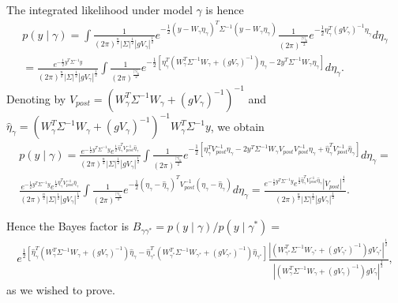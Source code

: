 The integrated likelihood under model $\gamma$ is hence
\begin{align}
 p(y \mid \gamma)= \int \frac{1}{(2\pi)^{\frac{n}{2}} |\Sigma|^{\frac{1}{2}} |g V_\gamma|^{\frac{1}{2}}} 
e^{  -\frac{1}{2} (y - W_\gamma \eta_\gamma)^T \Sigma^{-1} (y - W_\gamma \eta_\gamma)}
\frac{1}{(2\pi)^{\frac{|\gamma|_0}{2}}} 
e^{ -\frac{1}{2} \eta_\gamma^T (gV_\gamma)^{-1} \eta_\gamma}
d \eta_\gamma
\nonumber \\
=\frac{e^{-\frac{1}{2}y^T \Sigma^{-1} y}}{(2\pi)^{\frac{n}{2}} |\Sigma|^{\frac{1}{2}} |g V_\gamma|^{\frac{1}{2}}} 
\int \frac{1}{(2\pi)^{\frac{|\gamma|_0}{2}} } 
e^{-\frac{1}{2} \left[ \eta_\gamma^T (W_\gamma^T \Sigma^{-1} W_\gamma + (g V_\gamma)^{-1}) \eta_\gamma - 2 y^T \Sigma^{-1} W_\gamma \eta_\gamma  \right]}
d \eta_\gamma.
\nonumber
\end{align}
Denoting by $V_{post}= (W_\gamma^T \Sigma^{-1} W_\gamma + (g V_\gamma)^{-1})^{-1}$ and
$\hat{\eta}_\gamma= (W_\gamma^T \Sigma^{-1} W_\gamma + (g V_\gamma)^{-1})^{-1} W_\gamma^T \Sigma^{-1} y$, we obtain
\begin{align}
  p(y \mid \gamma)= 
\frac{e^{-\frac{1}{2}y^T \Sigma^{-1} y} e^{\frac{1}{2}\hat{\eta}_\gamma^T V_{post}^{-1} \hat{\eta}_\gamma}}{(2\pi)^{\frac{n}{2}} |\Sigma|^{\frac{1}{2}} |g V_\gamma|^{\frac{1}{2}}} 
\int \frac{1}{(2\pi)^{\frac{|\gamma|_0}{2}} } 
e^{-\frac{1}{2} \left[ \eta_\gamma^T V_{post}^{-1} \eta_\gamma - 2 y^T \Sigma^{-1} W_\gamma V_{post} V_{post}^{-1} \eta_\gamma + \hat{\eta}_\gamma^T V_{post}^{-1} \hat{\eta}_\gamma  \right]}
d \eta_\gamma=
\nonumber \\
\frac{e^{-\frac{1}{2}y^T \Sigma^{-1} y} e^{\frac{1}{2}\hat{\eta}_\gamma^T V_{post}^{-1} \hat{\eta}_\gamma}}{(2\pi)^{\frac{n}{2}} |\Sigma|^{\frac{1}{2}}  |g V_\gamma|^{\frac{1}{2}}} 
\int \frac{1}{(2\pi)^{\frac{|\gamma|_0}{2}}} 
e^{-\frac{1}{2} (\eta_\gamma - \hat{\eta}_\gamma)^T V_{post}^{-1} (\eta_\gamma - \hat{\eta}_\gamma)}
d \eta_\gamma=
\frac{e^{-\frac{1}{2}y^T \Sigma^{-1} y} e^{\frac{1}{2}\hat{\eta}_\gamma^T V_{post}^{-1} \hat{\eta}_\gamma} |V_{post}|^{\frac{1}{2}}}{(2\pi)^{\frac{n}{2}} |\Sigma|^{\frac{1}{2}}  |g V_\gamma|^{\frac{1}{2}}}.
\nonumber
\end{align}

Hence the Bayes factor is $ B_{\gamma \gamma^*}= p(y \mid \gamma) / p(y \mid \gamma^*)=$
\begin{align}
e^{\frac{1}{2}[\hat{\eta}_\gamma^T (W_\gamma^T \Sigma^{-1} W_\gamma + (g V_\gamma)^{-1}) \hat{\eta}_\gamma - \hat{\eta}_{\gamma^*}^T (W_{\gamma^*}^T \Sigma^{-1} W_{\gamma^*} + (g V_{\gamma^*})^{-1}) \hat{\eta}_{\gamma^*}]}
\frac{|(W_{\gamma^*}^T \Sigma^{-1} W_{\gamma^*} + (g V_{\gamma^*})^{-1})g V_{\gamma^*}|^{\frac{1}{2}}}{|(W_\gamma^T \Sigma^{-1} W_\gamma + (g V_\gamma)^{-1})g V_\gamma|^{\frac{1}{2}}},
\nonumber
\end{align}
as we wished to prove.





